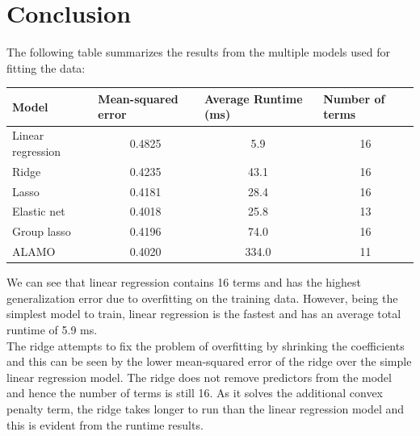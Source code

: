 \documentclass[a4paper,12pt]{article}
\begin{document}
\section{Conclusion}
The following table summarizes the results from the multiple models used for fitting the data:
\begin{table}[H]
\begin{tabular}{|l|c|c|c|}
\hline
\textbf{Model}    & \multicolumn{1}{l|}{\textbf{Mean-squared error}} & \multicolumn{1}{l|}{\textbf{Average Runtime (ms)}} & \multicolumn{1}{l|}{\textbf{Number of terms}} \\ \hline
Linear regression & 0.4825                                           & 5.9                                                & 16                                            \\ \hline
Ridge             & 0.4235                                           & 43.1                                               & 16                                            \\ \hline
Lasso             & 0.4181                                           & 28.4                                               & 16                                            \\ \hline
Elastic net       & 0.4018                                           & 25.8                                               & 13                                            \\ \hline
Group lasso       & 0.4196                                           & 74.0                                               & 16                                            \\ \hline
ALAMO             & 0.4020                                           & 334.0                                              & 11                                            \\ \hline
\end{tabular}
\end{table}
\noindent We can see that linear regression contains 16 terms and has the highest generalization error due to overfitting on the training data. However, being the simplest model to train, linear regression is the fastest and has an average total runtime  of 5.9 ms.\\

\noindent The ridge attempts to fix the problem of overfitting by shrinking the coefficients and this can be seen by the lower mean-squared error of the ridge over the simple linear regression model. The ridge does not remove predictors from the model and hence the number of terms is still 16. As it solves the additional convex penalty term, the ridge takes longer to run than the linear regression model and this is evident from the runtime results. \\
\end{document}
